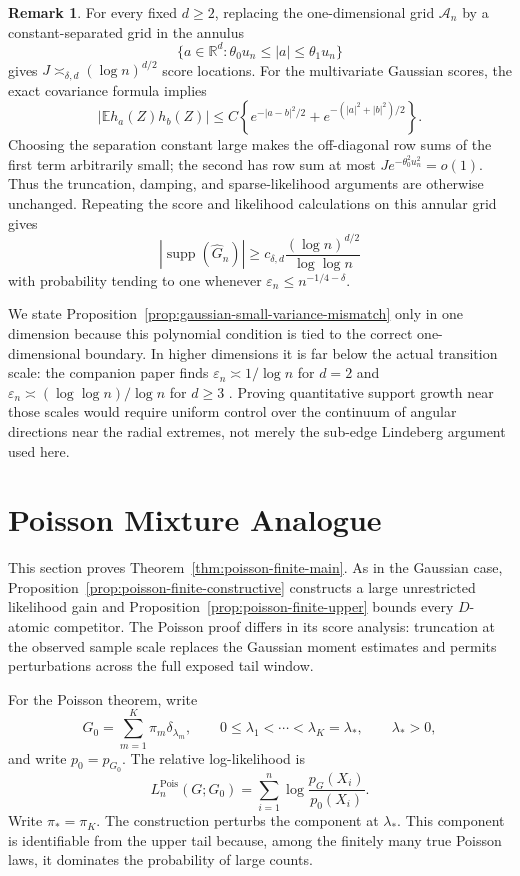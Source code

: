 \documentclass[11pt]{article}
\theoremstyle{definition}
\newtheorem{remark}[theorem]{Remark}
\numberwithin{equation}{section}
\newcommand{\R}{\mathbb{R}}
\newcommand{\wh}{\widehat}
\newcommand{\eps}{\varepsilon}
\DeclareMathOperator{\supp}{supp}
\begin{document}
\begin{remark}
For every fixed \(d\ge2\), replacing the one-dimensional grid
\(\mathcal A_n\) by a
constant-separated grid in the annulus
\[
    \{a\in\R^d:\theta_0u_n\le |a|\le\theta_1u_n\}
\]
gives \(J\asymp_{\delta,d}(\log n)^{d/2}\) score locations. For the
multivariate Gaussian scores, the exact covariance formula implies
\[
 |\mathbb E h_a(Z)h_b(Z)|
 \le C\left\{e^{-|a-b|^2/2}
       +e^{-(|a|^2+|b|^2)/2}\right\}.
\]
Choosing the separation constant large makes the off-diagonal row sums of
the first term arbitrarily small; the second has row sum at most
\(J e^{-\theta_0^2u_n^2}=o(1)\). Thus the truncation, damping, and
sparse-likelihood arguments are otherwise unchanged.
Repeating the score and likelihood calculations on this annular grid gives
\[
    |\supp(\wh G_n)|
    \ge
    c_{\delta,d}\frac{(\log n)^{d/2}}{\log\log n}
\]
with probability tending to one whenever
\(\eps_n\le n^{-1/4-\delta}\).

We state Proposition~\ref{prop:gaussian-small-variance-mismatch} only in one
dimension because this polynomial condition is tied to the correct
one-dimensional boundary. In higher dimensions it is far below the actual
transition scale: the companion paper finds
\(\eps_n\asymp1/\log n\) for \(d=2\) and
\(\eps_n\asymp(\log\log n)/\log n\) for \(d\ge3\)
\cite{varianceMultivariateCompanion}. Proving quantitative support growth
near those scales would require uniform control over the continuum of angular
directions near the radial extremes, not merely the sub-edge Lindeberg
argument used here.
\end{remark}


\section{Poisson Mixture Analogue}
\label{sec:poisson-analogue}

This section proves Theorem~\ref{thm:poisson-finite-main}. As in the Gaussian
case, Proposition~\ref{prop:poisson-finite-constructive} constructs a large
unrestricted likelihood gain and Proposition~\ref{prop:poisson-finite-upper}
bounds every \(D\)-atomic competitor. The Poisson proof differs in its score
analysis: truncation at the observed sample scale replaces the Gaussian
moment estimates and permits perturbations across the full exposed tail
window.

For the Poisson theorem, write
\[
    G_0=\sum_{m=1}^K\pi_m\delta_{\lambda_m},
    \qquad
    0\le \lambda_1<\cdots<\lambda_K=\lambda_*,
    \qquad \lambda_*>0,
\]
and write \(p_0=p_{G_0}\). The relative log-likelihood is
\[
    L_n^{\mathrm{Pois}}(G;G_0)
    =
    \sum_{i=1}^n\log\frac{p_G(X_i)}{p_0(X_i)}.
\]
Write \(\pi_*=\pi_K\). The construction perturbs the component at
\(\lambda_*\). This component is identifiable from the upper tail because,
among the finitely many true Poisson laws, it dominates the probability of
large counts.
\end{document}
